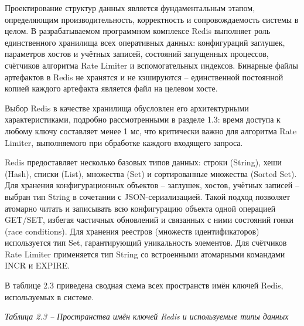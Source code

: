 \documentclass[
]{article}
\begin{document}
Проектирование структур данных является фундаментальным этапом,
определяющим производительность, корректность и сопровождаемость системы
в целом. В разрабатываемом программном комплексе Redis выполняет роль
единственного хранилища всех оперативных данных: конфигураций заглушек,
параметров хостов и учётных записей, состояний запущенных процессов,
счётчиков алгоритма Rate Limiter и вспомогательных индексов. Бинарные
файлы артефактов в Redis не хранятся и не кэшируются -- единственной
постоянной копией каждого артефакта является файл на целевом хосте.

Выбор Redis в качестве хранилища обусловлен его архитектурными
характеристиками, подробно рассмотренными в разделе 1.3: время доступа к
любому ключу составляет менее 1 мс, что критически важно для алгоритма
Rate Limiter, выполняемого при обработке каждого входящего запроса.

Redis предоставляет несколько базовых типов данных: строки (String),
хеши (Hash), списки (List), множества (Set) и сортированные множества
(Sorted Set). Для хранения конфигурационных объектов -- заглушек,
хостов, учётных записей -- выбран тип String в сочетании с
JSON-сериализацией. Такой подход позволяет атомарно читать и записывать
всю конфигурацию объекта одной операцией GET/SET, избегая частичных
обновлений и связанных с ними состояний гонки (race conditions). Для
хранения реестров (множеств идентификаторов) используется тип Set,
гарантирующий уникальность элементов. Для счётчиков Rate Limiter
применяется тип String со встроенными атомарными командами INCR и
EXPIRE.

В таблице 2.3 приведена сводная схема всех пространств имён ключей
Redis, используемых в системе.

\emph{Таблица 2.3 -- Пространства имён ключей Redis и используемые типы
данных}
\end{document}
